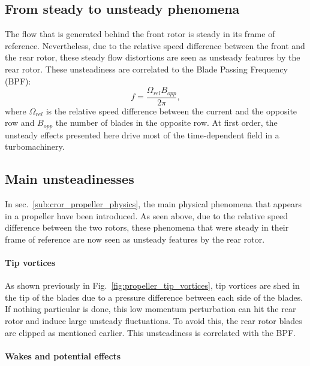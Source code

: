 
\subsection{From steady to unsteady phenomena}
\label{sub:cror_from_steady_to_unsteady_phenomena}

The flow that is generated behind the front rotor
is steady in its frame of reference. Nevertheless,
due to the relative speed difference between the
front and the rear rotor, these steady flow distortions are
seen as unsteady features by the rear rotor. 
These unsteadiness are correlated to the Blade Passing Frequency (BPF):
\begin{equation}
	f = \frac{\Omega_{rel} B_{opp}}{2 \pi},
\end{equation}
where $\Omega_{rel}$ is the relative speed difference between
the current and the opposite row
and $B_{opp}$ the number of blades in the opposite row.
At first order, the unsteady effects presented here drive
most of the time-dependent field in a turbomachinery.

\subsection{Main unsteadinesses}
\label{sub:cror_main_unsteadinesses}

In sec.~\ref{sub:cror_propeller_physics}, the main physical phenomena
that appears in a propeller have been introduced. As seen above, due to
the relative speed difference between the two rotors, these phenomena
that were steady in their frame of reference are now seen as unsteady features
by the rear rotor.

\paragraph{Tip vortices}

As shown previously in Fig.~\ref{fig:propeller_tip_vortices}, tip vortices are shed in the
tip of the blades due to a pressure difference between each side of the blades.
If nothing particular is done, this low momentum perturbation can
hit the rear rotor and induce large unsteady fluctuations. To avoid this,
the rear rotor blades are clipped as mentioned earlier. 
This unsteadiness is correlated with the BPF.

\paragraph{Wakes and potential effects}


